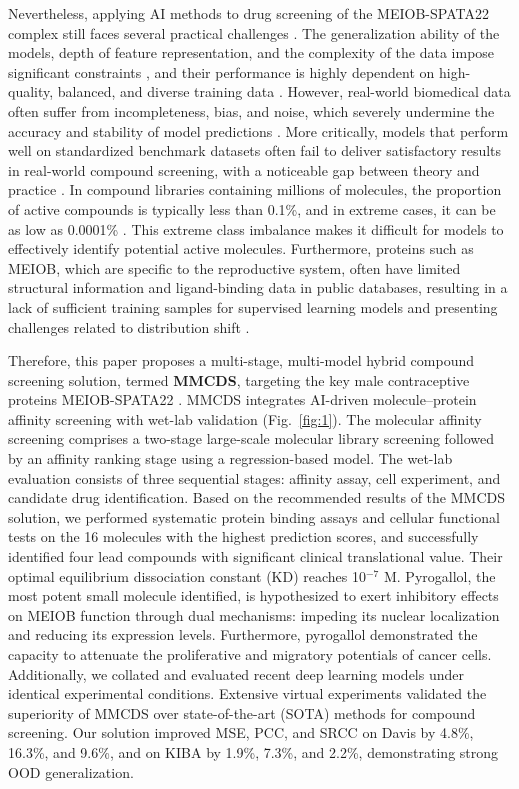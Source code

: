 \documentclass[preprint,12pt]{elsarticle}
\theoremstyle{plain}
\theoremstyle{definition}
\theoremstyle{remark}
\begin{document}
Nevertheless, applying AI methods to drug screening of the MEIOB-SPATA22 complex still faces several practical challenges \cite{35,36}. The generalization ability of the models, depth of feature representation, and the complexity of the data impose significant constraints \cite{37}, and their performance is highly dependent on high-quality, balanced, and diverse training data \cite{38,39}. However, real-world biomedical data often suffer from incompleteness, bias, and noise, which severely undermine the accuracy and stability of model predictions \cite{40}. More critically, models that perform well on standardized benchmark datasets often fail to deliver satisfactory results in real-world compound screening, with a noticeable gap between theory and practice \cite{41}. In compound libraries containing millions of molecules, the proportion of active compounds is typically less than 0.1\%, and in extreme cases, it can be as low as 0.0001\% \cite{42,43}. This extreme class imbalance makes it difficult for models to effectively identify potential active molecules. Furthermore, proteins such as MEIOB, which are specific to the reproductive system, often have limited structural information and ligand-binding data in public databases, resulting in a lack of sufficient training samples for supervised learning models and presenting challenges related to distribution shift \cite{44}.


Therefore, this paper proposes a multi-stage, multi-model hybrid compound screening solution, termed \textbf{MMCDS}, targeting the key male contraceptive proteins MEIOB-SPATA22 \cite{9,15}. MMCDS integrates AI-driven molecule–protein affinity screening with wet-lab validation (Fig.~\ref{fig:1}). The molecular affinity screening comprises a two-stage large-scale molecular library screening followed by an affinity ranking stage using a regression-based model. The wet-lab evaluation consists of three sequential stages: affinity assay, cell experiment, and candidate drug identification. Based on the recommended results of the MMCDS solution, we performed systematic protein binding assays and cellular functional tests on the 16 molecules with the highest prediction scores, and successfully identified four lead compounds with significant clinical translational value. Their optimal equilibrium dissociation constant (KD) reaches 10$^{-7}$ M. Pyrogallol, the most potent small molecule identified, is hypothesized to exert inhibitory effects on MEIOB function through dual mechanisms: impeding its nuclear localization and reducing its expression levels. Furthermore, pyrogallol demonstrated the capacity to attenuate the proliferative and migratory potentials of cancer cells. Additionally, we collated and evaluated recent deep learning models under identical experimental conditions. Extensive virtual experiments validated the superiority of MMCDS over state-of-the-art (SOTA) methods for compound screening.  Our solution improved MSE, PCC, and SRCC on Davis by 4.8\%, 16.3\%, and 9.6\%, and on KIBA by 1.9\%, 7.3\%, and 2.2\%, demonstrating strong OOD generalization.
\end{document}

